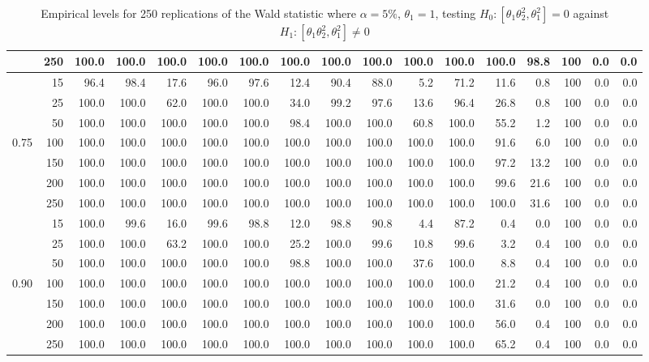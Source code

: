 \documentclass[]{article}\usepackage[]{graphicx}\usepackage[]{color}
\begin{document}
\begin{table}[H]
{\begin{tabular}{|r|r|r|r|r|r|r|r|r|r|r|r|r|r|r|r|r|}
			& 250 & 100.0 & 100.0 & 100.0 & 100.0 & 100.0 & 100.0 & 100.0 & 100.0 & 100.0 & 100.0 & 100.0 & 98.8 & 100 & 0.0 & 0.0 \\
			\hline
			& 15 & 96.4 & 98.4 & 17.6 & 96.0 & 97.6 & 12.4 & 90.4 & 88.0 & 5.2 & 71.2 & 11.6 & 0.8 & 100 & 0.0 & 0.0 \\
			& 25 & 100.0 & 100.0 & 62.0 & 100.0 & 100.0 & 34.0 & 99.2 & 97.6 & 13.6 & 96.4 & 26.8 & 0.8 & 100 & 0.0 & 0.0 \\
			& 50 & 100.0 & 100.0 & 100.0 & 100.0 & 100.0 & 98.4 & 100.0 & 100.0 & 60.8 & 100.0 & 55.2 & 1.2 & 100 & 0.0 & 0.0 \\
			0.75 & 100 & 100.0 & 100.0 & 100.0 & 100.0 & 100.0 & 100.0 & 100.0 & 100.0 & 100.0 & 100.0 & 91.6 & 6.0 & 100 & 0.0 & 0.0 \\
			& 150 & 100.0 & 100.0 & 100.0 & 100.0 & 100.0 & 100.0 & 100.0 & 100.0 & 100.0 & 100.0 & 97.2 & 13.2 & 100 & 0.0 & 0.0 \\
			& 200 & 100.0 & 100.0 & 100.0 & 100.0 & 100.0 & 100.0 & 100.0 & 100.0 & 100.0 & 100.0 & 99.6 & 21.6 & 100 & 0.0 & 0.0 \\
			& 250 & 100.0 & 100.0 & 100.0 & 100.0 & 100.0 & 100.0 & 100.0 & 100.0 & 100.0 & 100.0 & 100.0 & 31.6 & 100 & 0.0 & 0.0 \\
			\hline
			& 15 & 100.0 & 99.6 & 16.0 & 99.6 & 98.8 & 12.0 & 98.8 & 90.8 & 4.4 & 87.2 & 0.4 & 0.0 & 100 & 0.0 & 0.0 \\
			& 25 & 100.0 & 100.0 & 63.2 & 100.0 & 100.0 & 25.2 & 100.0 & 99.6 & 10.8 & 99.6 & 3.2 & 0.4 & 100 & 0.0 & 0.0 \\
			& 50 & 100.0 & 100.0 & 100.0 & 100.0 & 100.0 & 98.8 & 100.0 & 100.0 & 37.6 & 100.0 & 8.8 & 0.4 & 100 & 0.0 & 0.0 \\
			0.90 & 100 & 100.0 & 100.0 & 100.0 & 100.0 & 100.0 & 100.0 & 100.0 & 100.0 & 100.0 & 100.0 & 21.2 & 0.4 & 100 & 0.0 & 0.0 \\
			& 150 & 100.0 & 100.0 & 100.0 & 100.0 & 100.0 & 100.0 & 100.0 & 100.0 & 100.0 & 100.0 & 31.6 & 0.0 & 100 & 0.0 & 0.0 \\
			& 200 & 100.0 & 100.0 & 100.0 & 100.0 & 100.0 & 100.0 & 100.0 & 100.0 & 100.0 & 100.0 & 56.0 & 0.4 & 100 & 0.0 & 0.0 \\
			& 250 & 100.0 & 100.0 & 100.0 & 100.0 & 100.0 & 100.0 & 100.0 & 100.0 & 100.0 & 100.0 & 65.2 & 0.4 & 100 & 0.0 & 0.0 \\
			\hline
		\end{tabular}
	}
	\caption{Empirical levels for 250 replications of the Wald statistic where $\alpha = 5\%$, $\theta_1=1$, testing $H_0: \left[ \theta_1\theta_2^2, \theta_1^2\right] =0$ against $H_1: \left[ \theta_1\theta_2^2, \theta_1^2\right] \neq 0$}
	\label{tbl:W:16}
\end{table}
\end{document}
